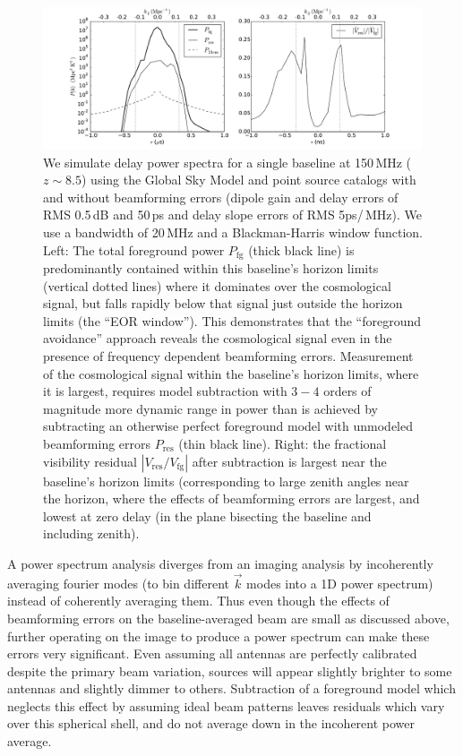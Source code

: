 \begin{figure}[t]
\includegraphics[width=6.5in]{chap2_beamforming_errors/bf_errors_in_visibilities.pdf}
\caption[Simulations of the effects of beamforming errors on foreground subtraction and avoidance techniques for a single baseline analysis.]{We simulate delay power spectra for a single baseline at 150\,MHz ($z\sim8.5$) using the Global Sky Model and point source catalogs with and without beamforming errors (dipole gain and delay errors of RMS 0.5\,dB and 50\,ps and delay slope errors of RMS 5ps/\,MHz). We use a bandwidth of 20\,MHz and a Blackman-Harris window function. Left: The total foreground power $P_\mathrm{fg}$ (thick black line) is predominantly contained within this baseline's horizon limits (vertical dotted lines) where it dominates over the cosmological signal, but falls rapidly below that signal just outside the horizon limits (the ``EOR window''). This demonstrates that the ``foreground avoidance'' approach reveals the cosmological signal even in the presence of frequency dependent beamforming errors. Measurement of the cosmological signal within the baseline's horizon limits, where it is largest, requires model subtraction with $3-4$ orders of magnitude more dynamic range in power than is achieved by subtracting an otherwise perfect foreground model with unmodeled beamforming errors $P_\mathrm{res}$ (thin black line). Right: the fractional visibility residual $|V_\mathrm{res}/V_\mathrm{fg}|$ after subtraction is largest near the baseline's horizon limits (corresponding to large zenith angles near the horizon, where the effects of beamforming errors are largest, and lowest at zero delay (in the plane bisecting the baseline and including zenith). }
\label{fig:bferrorsinps}
\end{figure}


A power spectrum analysis diverges from an imaging analysis by incoherently averaging fourier modes (to bin different $\vec{k}$ modes into a 1D power spectrum) instead of coherently averaging them. Thus even though the effects of beamforming errors on the baseline-averaged beam are small as discussed above, further operating on the image to produce a power spectrum can make these errors very significant. Even assuming all antennas are perfectly calibrated despite the primary beam variation, sources will appear slightly brighter to some antennas and slightly dimmer to others. Subtraction of a foreground model which neglects this effect by assuming ideal beam patterns leaves residuals which vary over this spherical shell, and do not average down in the incoherent power average. 

